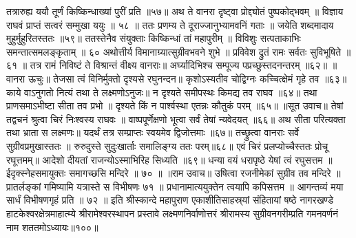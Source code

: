 तत्रारुह्य ययौ तूर्णं किष्किन्धाख्यां पुरीं प्रति ॥५७॥
अथ ते वानरा दृष्ट्वा प्रोद्द्योतं पुष्पकोद्भवम् ॥
विज्ञाय राघवं प्राप्तं सत्वरं सम्मुखा ययुः ॥ ५८ ॥
ततः प्रणम्य ते दूराज्जानुभ्यामवनिं गताः ॥
जयेति शब्दमादाय मुहुर्मुहुरितस्ततः ॥५९॥
ततस्तेनैव संयुक्ताः किष्किन्धां तां महापुरीम् ॥
विविशुः सत्पताकाभिः समन्तात्समलङ्कृताम् ॥ ६०
अथोत्तीर्य विमानाग्र्यात्सुग्रीवभवने शुभे ॥
प्रविवेश द्रुतं रामः सर्वतः सुविभूषिते ॥ ६१ ॥
तत्र रामं निविष्टं ते विश्रान्तं वीक्ष्य वानराः॥
अर्घ्यादिभिश्च सम्पूज्य पप्रच्छुस्तदनन्तरम् ॥६२॥
॥वानरा ऊचुः॥
तेजसा त्वं विनिर्मुक्तो दृश्यसे रघुनन्दन॥
कृशोऽस्यतीव चोद्विग्नः कच्चित्क्षेमं गृहे तव ॥६३॥
काये वाऽनुगतो नित्यं तथा ते लक्ष्मणोऽनुजः॥
न दृश्यते समीपस्थः किमद्य तव राघव ॥६४॥
तथा प्राणसमाऽभीष्टा सीता तव प्रभो ॥
दृश्यते किं न पार्श्वस्था एतन्नः कौतुकं परम् ॥६५॥
॥सूत उवाच॥
तेषां तद्वचनं श्रुत्वा चिरं निःश्वस्य राघवः ॥
वाष्पपूर्णेक्षणो भूत्वा सर्वं तेषां न्यवेदयत् ॥६६॥
अथ सीता परित्यक्ता तथा भ्राता स लक्ष्मणः॥
यदर्थं तत्र सम्प्राप्तः स्वयमेव द्विजोत्तमाः ॥६७॥
तच्छ्रुत्वा वानराः सर्वे सुग्रीवप्रमुखास्ततः ॥
रुरुदुस्ते सुदुःखार्ताः समालिङ्ग्य ततः परम्॥६८॥
एवं चिरं प्रलप्योच्चैस्ततः प्रोचू रघूत्तमम्॥
आदेशो दीयतां राजन्योऽस्माभिरिह सिध्यति ॥६९॥
धन्या वयं धरापृष्ठे येषां त्वं रघुसत्तम ॥
ईदृक्स्नेहसमायुक्तः समागच्छसि मन्दिरे ॥ ७० ॥
॥राम उवाच॥
उषित्वा रजनीमेकां सुग्रीव तव मन्दिरे ॥
प्रातर्लङ्कां गमिष्यामि यत्रास्ते स विभीषणः ७१ ॥
प्रधानामात्ययुक्तेन त्वयापि कपिसत्तम ॥
आगन्तव्यं मया सार्धं विभीषणगृहं प्रति ॥ ७२ ॥
इति श्रीस्कान्दे महापुराण एकाशीतिसाहस्र्यां संहितायां षष्ठे नागरखण्डे हाटकेश्वरक्षेत्रमाहात्म्ये श्रीरामेश्वरस्थापन प्रस्तावे लक्ष्मणनिर्वाणोत्तरं श्रीरामस्य सुग्रीवनगरीम्प्रति गमनवर्णनं नाम शततमोऽध्यायः॥१००॥

